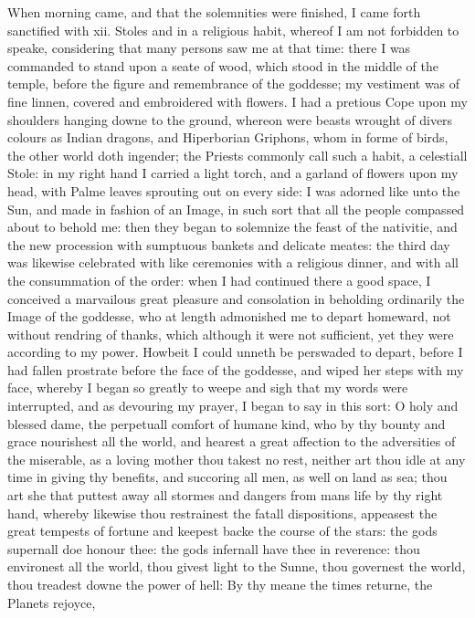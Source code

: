 When morning came, and that the solemnities were finished, I came forth
sanctified with xii. Stoles and in a religious habit, whereof I am not
forbidden to speake, considering that many persons saw me at that time: there I
was commanded to stand upon a seate of wood, which stood in the middle of the
temple, before the figure and remembrance of the goddesse; my vestiment was of
fine linnen, covered and embroidered with flowers. I had a pretious Cope upon
my shoulders hanging downe to the ground, whereon were beasts wrought of divers
colours as Indian dragons, and Hiperborian Griphons, whom in forme of birds,
the other world doth ingender; the Priests commonly call such a habit, a
celestiall Stole: in my right hand I carried a light torch, and a garland of
flowers upon my head, with Palme leaves sprouting out on every side: I was
adorned like unto the Sun, and made in fashion of an Image, in such sort that
all the people compassed about to behold me: then they began to solemnize the
feast of the nativitie, and the new procession with sumptuous bankets and
delicate meates: the third day was likewise celebrated with like ceremonies
with a religious dinner, and with all the consummation of the order: when I had
continued there a good space, I conceived a marvailous great pleasure and
consolation in beholding ordinarily the Image of the goddesse, who at length
admonished me to depart homeward, not without rendring of thanks, which
although it were not sufficient, yet they were according to my power. Howbeit I
could unneth be perswaded to depart, before I had fallen prostrate before the
face of the goddesse, and wiped her steps with my face, whereby I began so
greatly to weepe and sigh that my words were interrupted, and as devouring my
prayer, I began to say in this sort: O holy and blessed dame, the perpetuall
comfort of humane kind, who by thy bounty and grace nourishest all the world,
and hearest a great affection to the adversities of the miserable, as a loving
mother thou takest no rest, neither art thou idle at any time in giving thy
benefits, and succoring all men, as well on land as sea; thou art she that
puttest away all stormes and dangers from mans life by thy right hand, whereby
likewise thou restrainest the fatall dispositions, appeasest the great tempests
of fortune and keepest backe the course of the stars: the gods supernall doe
honour thee: the gods infernall have thee in reverence: thou environest all the
world, thou givest light to the Sunne, thou governest the world, thou treadest
downe the power of hell: By thy meane the times returne, the Planets rejoyce,
